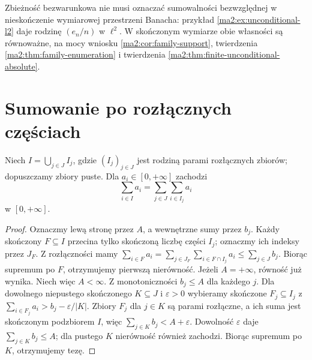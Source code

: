 \begin{uwaga}
Zbieżność bezwarunkowa nie musi oznaczać sumowalności
bezwzględnej w nieskończenie wymiarowej przestrzeni
Banacha: przykład \ref{ma2:ex:unconditional-l2}
daje rodzinę $(e_n/n)$ w $\ell^2$.
W skończonym wymiarze obie własności są równoważne,
na mocy wniosku \ref{ma2:cor:family-support},
twierdzenia \ref{ma2:thm:family-enumeration} i twierdzenia
\ref{ma2:thm:finite-unconditional-absolute}.
\end{uwaga}

\section{Sumowanie po rozłącznych częściach}

\begin{twierdzenie}
\label{ma2:thm:family-tonelli}
Niech $I=\bigcup_{j\in J}I_j$, gdzie $(I_j)_{j\in J}$
jest rodziną parami rozłącznych zbiorów; dopuszczamy
zbiory puste. Dla $a_i\in[0,+\infty]$ zachodzi
\[
 \sum_{i\in I}a_i=\sum_{j\in J}\sum_{i\in I_j}a_i
\]
w $[0,+\infty]$.
\end{twierdzenie}
\begin{proof}
Oznaczmy lewą stronę przez $A$, a wewnętrzne sumy
przez $b_j$. Każdy skończony $F\subseteq I$
przecina tylko skończoną liczbę części $I_j$;
oznaczmy ich indeksy przez $J_F$.
Z rozłączności mamy
$\sum_{i\in F}a_i=\sum_{j\in J_F}\sum_{i\in F\cap I_j}a_i
\le\sum_{j\in J}b_j$. Biorąc supremum po $F$,
otrzymujemy pierwszą nierówność.
Jeżeli $A=+\infty$, równość już wynika.
Niech więc $A<\infty$. Z monotoniczności
$b_j\le A$ dla każdego $j$. Dla dowolnego niepustego
skończonego $K\subseteq J$ i $\varepsilon>0$ wybieramy
skończone $F_j\subseteq I_j$ z
$\sum_{i\in F_j}a_i>b_j-\varepsilon/|K|$.
Zbiory $F_j$ dla $j\in K$ są parami rozłączne,
a ich suma jest skończonym podzbiorem $I$, więc
$\sum_{j\in K}b_j<A+\varepsilon$.
Dowolność $\varepsilon$ daje $\sum_{j\in K}b_j\le A$;
dla pustego $K$ nierówność również zachodzi.
Biorąc supremum po $K$, otrzymujemy tezę.
\end{proof}

